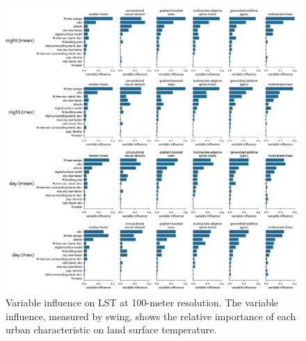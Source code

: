 \documentclass[final,3p,times,twocolumn,sort&compress]{elsarticle}
\begin{document}
\begin{figure}
    \begin{center}
    \includegraphics[width=\linewidth]{fig/report/importance_100.png}
    \caption[Variable influence on LST at 100-meter resolution]{
    Variable influence on LST at 100-meter resolution.
    The variable influence, measured by swing, shows the relative importance of each urban characteristic on land surface temperature.}
    \label{fig:importance_100}
    \end{center}
\end{figure}
\end{document}
